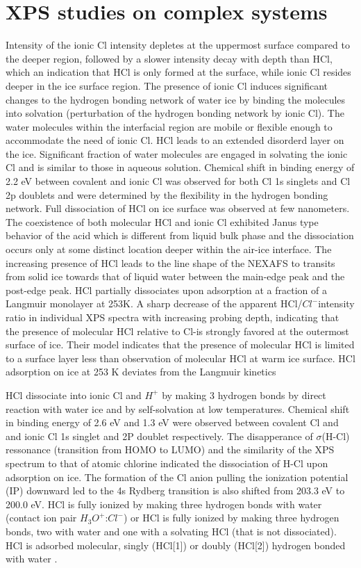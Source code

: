 \documentclass[a4paper,11pt]{report}
\begin{document}
\section{XPS studies on complex systems}
Intensity of the ionic Cl intensity depletes at the uppermost surface compared to the deeper region, followed by a slower intensity decay
with depth than HCl, which an indication that HCl is only formed at the surface,  while ionic Cl resides deeper in the ice surface region.
The presence of ionic Cl induces significant changes to the hydrogen bonding network of water
ice by binding the molecules into solvation (perturbation of the hydrogen 
bonding network by ionic Cl). The  water  molecules  within  the  interfacial
region  are mobile or flexible enough to accommodate the need of ionic 
Cl. HCl leads to an extended disorderd layer on the ice.
Significant fraction of water molecules are engaged in solvating the ionic
Cl and is similar to those in aqueous solution.
Chemical shift in binding energy of 2.2 eV between covalent and ionic Cl 
was observed for both Cl 1s singlets and Cl 2p doublets and 
were determined by the flexibility in the hydrogen bonding network.
Full dissociation of HCl on ice surface was observed at few nanometers. The coexistence of both
molecular HCl and ionic Cl exhibited Janus type behavior of the acid which is
different from liquid bulk phase and the dissociation occurs only at some distinct 
location deeper within the air-ice interface.  The increasing presence of HCl
leads to the line shape of the NEXAFS to transits from solid ice  towards  
that  of  liquid  water between the 
main-edge peak and the post-edge peak.  HCl partially  dissociates  upon  
adsorption  at  a fraction of a Langmuir monolayer at 253K. A sharp  decrease
of  the  apparent  HCl/$Cl^{-}$intensity  ratio  in  individual  XPS  spectra  with
increasing probing depth, indicating that the presence of molecular HCl
relative to Cl-is strongly favored at the outermost surface of
ice. Their model indicates that the presence of molecular HCl is limited
to a surface layer less than observation of molecular HCl at 
warm ice surface. HCl adsorption on ice at 253 K deviates from 
the Langmuir kinetics \citep{kong2017coexistence}

HCl dissociate into ionic Cl and $H^{+}$ by making 3 hydrogen bonds by direct
reaction with water ice and by self-solvation at low temperatures. Chemical shift in binding energy of 2.6 eV and 1.3 eV were 
observed between covalent Cl and and ionic Cl 1s singlet and 2P doublet respectively. The disapperance of $\sigma$(H-Cl) ressonance (transition
from HOMO to LUMO) and the similarity of the XPS spectrum to that of atomic chlorine indicated the dissociation of H-Cl upon adsorption on ice.
The formation of the Cl anion pulling the ionization potential (IP) downward led to the 4s Rydberg transition is also shifted from 203.3 eV
to 200.0 eV. HCl is fully ionized by making three hydrogen bonds with water 
(contact ion pair $H_{3}O^{+}$:$Cl^{-}$) or HCl is fully ionized by making three hydrogen
bonds, two with water and one with a solvating HCl (that is not dissociated).
HCl is adsorbed molecular, singly (HCl[1]) or doubly (HCl[2]) hydrogen 
bonded with water \citep{parent2011hcl}. 
\end{document}

